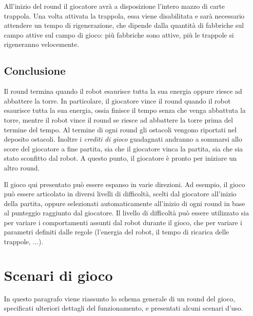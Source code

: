 All'inizio del round il giocatore avrà a disposizione l'intero mazzo di carte trappola. Una volta attivata la trappola, essa viene disabilitata e sarà necessario attendere un tempo di rigenerazione, che dipende dalla quantità di fabbriche sul campo attive sul campo di gioco: più fabbriche sono attive, più le trappole si rigeneranno velocemente. %

	\subsection*{Conclusione} 
Il round termina quando il robot esaurisce tutta la sua energia oppure riesce ad abbattere la torre. In particolare, il giocatore vince il round quando il robot esaurisce tutta la sua energia, ossia finisce il tempo senza che venga abbattuta la torre, mentre il robot vince il round se riesce ad abbattere la torre prima del termine del tempo.
Al termine di ogni round gli ostacoli vengono riportati nel deposito ostacoli. %
Inoltre i \emph{crediti di gioco} guadagnati andranno a sommarsi allo score del giocatore a fine partita, sia che il giocatore vinca la partita, sia che sia stato sconfitto dal robot.
A questo punto, il giocatore è pronto per iniziare un altro round. %

\begin{nota}
Il gioco qui presentato può essere espanso in varie direzioni. Ad esempio, il gioco può essere articolato in diversi livelli di difficoltà, scelti dal giocatore all'inizio della partita, oppure selezionati automaticamente all'inizio di ogni round in base al punteggio raggiunto dal giocatore. Il livello di difficoltà può essere utilizzato sia per variare i comportamenti assunti dal robot durante il gioco, che per variare i parametri definiti dalle regole (l'energia del robot, il tempo di ricarica delle trappole, ...).
\end{nota}

\section{Scenari di gioco}
In questo paragrafo viene riassunto lo schema generale di un round del gioco, specificati ulteriori dettagli del funzionamento, e presentati alcuni scenari d'uso.

